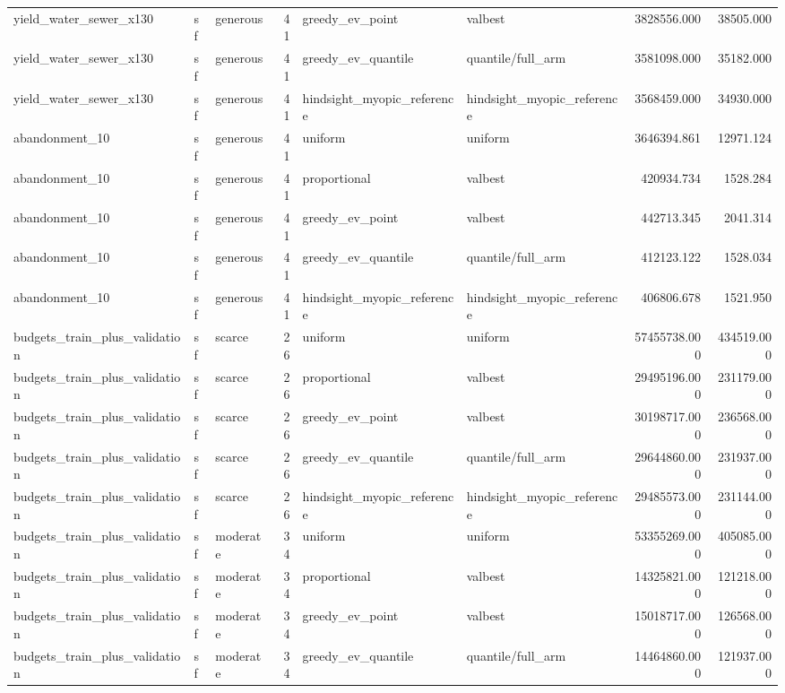 \begin{tabular}{lllrllrr}
yield\_water\_sewer\_x130 & sf & generous & 41 & greedy\_ev\_point & valbest & 3828556.000 & 38505.000 \\
yield\_water\_sewer\_x130 & sf & generous & 41 & greedy\_ev\_quantile & quantile/full\_arm & 3581098.000 & 35182.000 \\
yield\_water\_sewer\_x130 & sf & generous & 41 & hindsight\_myopic\_reference & hindsight\_myopic\_reference & 3568459.000 & 34930.000 \\
abandonment\_10 & sf & generous & 41 & uniform & uniform & 3646394.861 & 12971.124 \\
abandonment\_10 & sf & generous & 41 & proportional & valbest & 420934.734 & 1528.284 \\
abandonment\_10 & sf & generous & 41 & greedy\_ev\_point & valbest & 442713.345 & 2041.314 \\
abandonment\_10 & sf & generous & 41 & greedy\_ev\_quantile & quantile/full\_arm & 412123.122 & 1528.034 \\
abandonment\_10 & sf & generous & 41 & hindsight\_myopic\_reference & hindsight\_myopic\_reference & 406806.678 & 1521.950 \\
budgets\_train\_plus\_validation & sf & scarce & 26 & uniform & uniform & 57455738.000 & 434519.000 \\
budgets\_train\_plus\_validation & sf & scarce & 26 & proportional & valbest & 29495196.000 & 231179.000 \\
budgets\_train\_plus\_validation & sf & scarce & 26 & greedy\_ev\_point & valbest & 30198717.000 & 236568.000 \\
budgets\_train\_plus\_validation & sf & scarce & 26 & greedy\_ev\_quantile & quantile/full\_arm & 29644860.000 & 231937.000 \\
budgets\_train\_plus\_validation & sf & scarce & 26 & hindsight\_myopic\_reference & hindsight\_myopic\_reference & 29485573.000 & 231144.000 \\
budgets\_train\_plus\_validation & sf & moderate & 34 & uniform & uniform & 53355269.000 & 405085.000 \\
budgets\_train\_plus\_validation & sf & moderate & 34 & proportional & valbest & 14325821.000 & 121218.000 \\
budgets\_train\_plus\_validation & sf & moderate & 34 & greedy\_ev\_point & valbest & 15018717.000 & 126568.000 \\
budgets\_train\_plus\_validation & sf & moderate & 34 & greedy\_ev\_quantile & quantile/full\_arm & 14464860.000 & 121937.000 \\

\end{tabular}
